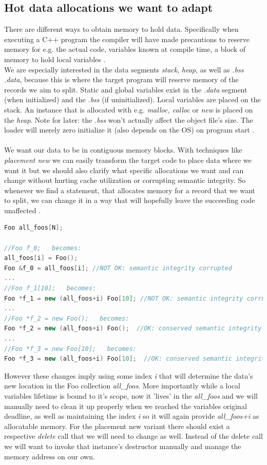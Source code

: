 \subsection{Hot data allocations we want to adapt}\label{hdawwta}
There are different ways to obtain memory to hold data. Specifically when executing a C++ program the compiler will have made precautions to reserve memory for e.g. the actual code, variables known at compile time, a block of memory to hold local variables .\\
We are especially interested in the data segments \textit{stack}, \textit{heap}, as well as \textit{.bss} \textit{.data}, because this is where the target program will reserve memory of the records we aim to split. Static and global variables exist in the \textit{.data} segment (when initialized) and the \textit{.bss} (if uninitialized). Local variables are placed on the stack. An instance that is allocated with e.g. \textit{malloc, calloc} or \textit{new} is placed on the \textit{heap}. Note for later: the \textit{.bss} won't actually affect the object file's size. The loader will merely zero initialize it (also depends on the OS) on program start .\\\\
We want our data to be in contiguous memory blocks. With techniques like \textit{placement new} we can easily transform the target code to place data where we want it but we should also clarify what specific allocations we want and can change without hurting cache utilization or corrupting semantic integrity. So whenever we find a statement, that allocates memory for a record that we want to split, we can change it in a way that will hopefully leave the succeeding code unaffected .
\begin{lstlisting}[language=C++,name={Examples of how we can change allocations using placement new to emplace the data where it is among related data.},label={alloc_changes}]
Foo all_foos[N];

//Foo f_0;   becomes:
all_foos[i] = Foo();
Foo &f_0 = all_foos[i]; //NOT OK: semantic integrity corrupted
...
//Foo f_1[10];   becomes:
Foo *f_1 = new (all_foos+i) Foo[10]; //NOT OK: semantic integrity corrupted
...
//Foo *f_2 = new Foo();   becomes:
Foo *f_2 = new (all_foos+i) Foo();  //OK: conserved semantic integrity
...
//Foo *f_3 = new Foo[10];   becomes:
Foo *f_3 = new (all_foos+i) Foo[10];  //OK: conserved semantic integrity
\end{lstlisting}
However these changes imply using some index \textit{i} that will determine the data's new location in the Foo collection \textit{all\_foos}. More importantly while a local variables lifetime is bound to it's scope, now it 'lives' in the \textit{all\_foos} and we will manually need to clean it up properly when we reached the variables original deadline, as well as maintaining the index \textit{i} so it will again provide \textit{all\_foos+i} as allocatable memory. For the placement new variant there should exist a respective \textit{delete} call that we will need to change as well. Instead of the delete call we will want to invoke that instance's destructor manually and manage the memory address on our own.\\
